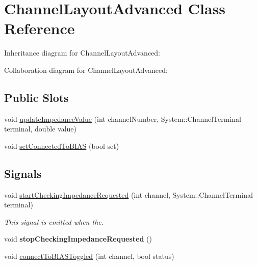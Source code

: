 \hypertarget{classChannelLayoutAdvanced}{\section{Channel\+Layout\+Advanced Class Reference}
\label{classChannelLayoutAdvanced}
}


Inheritance diagram for Channel\+Layout\+Advanced\+:


Collaboration diagram for Channel\+Layout\+Advanced\+:
\subsection*{Public Slots}
\begin{DoxyCompactItemize}
\item 
void \hyperlink{classChannelLayoutAdvanced_ad48eeec3ecdc2f9ce95eee211fc39ba7}{update\+Impedance\+Value} (int channel\+Number, System\+::\+Channel\+Terminal terminal, double value)
\item 
void \hyperlink{classChannelLayoutAdvanced_a283b1c5b0870dd9949f864b9fcd73000}{set\+Connected\+To\+B\+I\+A\+S} (bool set)
\end{DoxyCompactItemize}
\subsection*{Signals}
\begin{DoxyCompactItemize}
\item 
void \hyperlink{classChannelLayoutAdvanced_a91b635650fbb638df5b460de69560eb3}{start\+Checking\+Impedance\+Requested} (int channel, System\+::\+Channel\+Terminal terminal)
\begin{DoxyCompactList}\small\item\em This signal is emitted when the. \end{DoxyCompactList}\item 
\hypertarget{classChannelLayoutAdvanced_a30fa307005ac38bb11ad3829decc335c}{void {\bfseries stop\+Checking\+Impedance\+Requested} ()}\label{classChannelLayoutAdvanced_a30fa307005ac38bb11ad3829decc335c}

\item 
void \hyperlink{classChannelLayoutAdvanced_a4b26746769cd4eeeb22c9f7004e4b657}{connect\+To\+B\+I\+A\+S\+Toggled} (int channel, bool status)
\end{DoxyCompactItemize}
